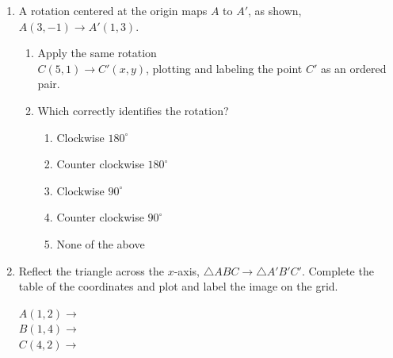\begin{enumerate}
\item A rotation centered at the origin maps $A$ to $A'$, as shown, $A(3,-1) \rightarrow A'(1,3)$.
\begin{multicols}{2}
\begin{enumerate}
  \item Apply the same rotation \\
  $C(5,1)\rightarrow C'(x,y)$, plotting and labeling the point $C'$ as an ordered pair.
  \item Which correctly identifies the rotation?
  \begin{enumerate}[label=(\Alph*)]
    \item Clockwise $180^\circ$
    \item Counter clockwise $180^\circ$
    \item Clockwise $90^\circ$
    \item Counter clockwise $90^\circ$
    \item None of the above
  \end{enumerate} \vspace{2cm}
  \end{enumerate}
  \begin{flushright}
  \end{flushright}
\end{multicols}

\item Reflect the triangle across the $x$-axis, $\triangle ABC \rightarrow \triangle A'B'C'$. Complete the table of the coordinates and plot and label the image on the grid. \vspace{0.5cm}
\begin{multicols}{2}
$A(1,2) \rightarrow$ \\[0.7cm]
$B(1,4) \rightarrow$ \\[0.7cm]
$C(4,2) \rightarrow$ \\[0.7cm]
\end{multicols}


\end{enumerate}

